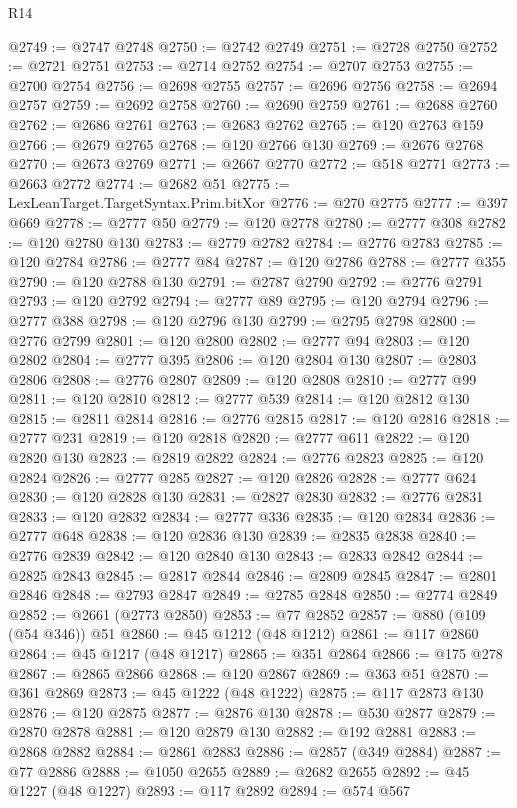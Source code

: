\begin{lexlean}{R14}
\begin{coremodule}
@2749 := @2747 @2748
@2750 := @2742 @2749
@2751 := @2728 @2750
@2752 := @2721 @2751
@2753 := @2714 @2752
@2754 := @2707 @2753
@2755 := @2700 @2754
@2756 := @2698 @2755
@2757 := @2696 @2756
@2758 := @2694 @2757
@2759 := @2692 @2758
@2760 := @2690 @2759
@2761 := @2688 @2760
@2762 := @2686 @2761
@2763 := @2683 @2762
@2765 := @120 @2763 @159
@2766 := @2679 @2765
@2768 := @120 @2766 @130
@2769 := @2676 @2768
@2770 := @2673 @2769
@2771 := @2667 @2770
@2772 := @518 @2771
@2773 := @2663 @2772
@2774 := @2682 @51
@2775 := LexLeanTarget.TargetSyntax.Prim.bitXor
@2776 := @270 @2775
@2777 := @397 @669
@2778 := @2777 @50
@2779 := @120 @2778
@2780 := @2777 @308
@2782 := @120 @2780 @130
@2783 := @2779 @2782
@2784 := @2776 @2783
@2785 := @120 @2784
@2786 := @2777 @84
@2787 := @120 @2786
@2788 := @2777 @355
@2790 := @120 @2788 @130
@2791 := @2787 @2790
@2792 := @2776 @2791
@2793 := @120 @2792
@2794 := @2777 @89
@2795 := @120 @2794
@2796 := @2777 @388
@2798 := @120 @2796 @130
@2799 := @2795 @2798
@2800 := @2776 @2799
@2801 := @120 @2800
@2802 := @2777 @94
@2803 := @120 @2802
@2804 := @2777 @395
@2806 := @120 @2804 @130
@2807 := @2803 @2806
@2808 := @2776 @2807
@2809 := @120 @2808
@2810 := @2777 @99
@2811 := @120 @2810
@2812 := @2777 @539
@2814 := @120 @2812 @130
@2815 := @2811 @2814
@2816 := @2776 @2815
@2817 := @120 @2816
@2818 := @2777 @231
@2819 := @120 @2818
@2820 := @2777 @611
@2822 := @120 @2820 @130
@2823 := @2819 @2822
@2824 := @2776 @2823
@2825 := @120 @2824
@2826 := @2777 @285
@2827 := @120 @2826
@2828 := @2777 @624
@2830 := @120 @2828 @130
@2831 := @2827 @2830
@2832 := @2776 @2831
@2833 := @120 @2832
@2834 := @2777 @336
@2835 := @120 @2834
@2836 := @2777 @648
@2838 := @120 @2836 @130
@2839 := @2835 @2838
@2840 := @2776 @2839
@2842 := @120 @2840 @130
@2843 := @2833 @2842
@2844 := @2825 @2843
@2845 := @2817 @2844
@2846 := @2809 @2845
@2847 := @2801 @2846
@2848 := @2793 @2847
@2849 := @2785 @2848
@2850 := @2774 @2849
@2852 := @2661 (@2773 @2850)
@2853 := @77 @2852
@2857 := @880 (@109 (@54 @346)) @51
@2860 := @45 @1212 (@48 @1212)
@2861 := @117 @2860
@2864 := @45 @1217 (@48 @1217)
@2865 := @351 @2864
@2866 := @175 @278
@2867 := @2865 @2866
@2868 := @120 @2867
@2869 := @363 @51
@2870 := @361 @2869
@2873 := @45 @1222 (@48 @1222)
@2875 := @117 @2873 @130
@2876 := @120 @2875
@2877 := @2876 @130
@2878 := @530 @2877
@2879 := @2870 @2878
@2881 := @120 @2879 @130
@2882 := @192 @2881
@2883 := @2868 @2882
@2884 := @2861 @2883
@2886 := @2857 (@349 @2884)
@2887 := @77 @2886
@2888 := @1050 @2655
@2889 := @2682 @2655
@2892 := @45 @1227 (@48 @1227)
@2893 := @117 @2892
@2894 := @574 @567

\end{coremodule}
\end{lexlean}
